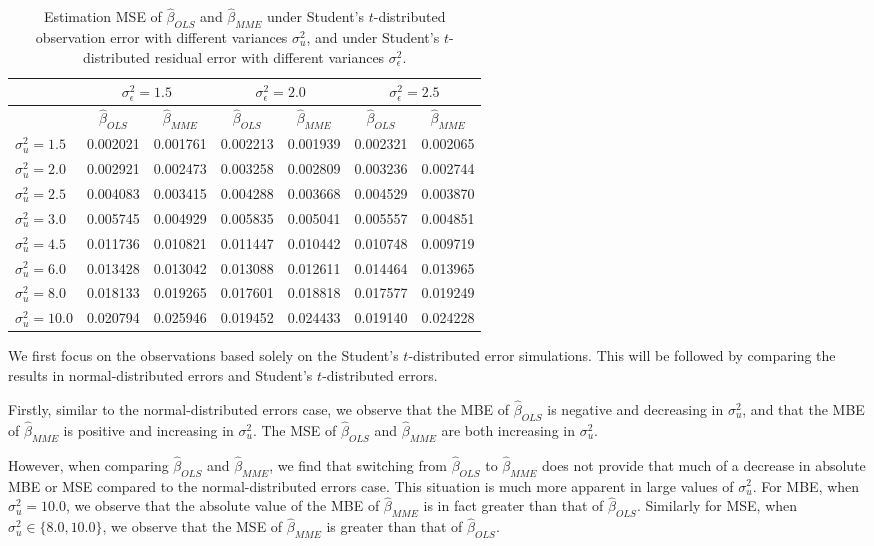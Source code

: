 \documentclass{article}
\begin{document}
\begin{table}[ht]
    \centering
    \caption{Estimation MSE of $\hat{\beta}_{OLS}$ and $\hat{\beta}_{MME}$ under Student's $t$-distributed observation error with different variances $\sigma^2_u$, and under Student's $t$-distributed residual error with different variances $\sigma^2_\epsilon$.}
    \label{Tab:MSE_t}
    \begin{tabular}[t]{lcccccc}
        \hline
        &\multicolumn{2}{c}{$\sigma^2_\epsilon=1.5$}&\multicolumn{2}{c}{$\sigma^2_\epsilon=2.0$}&\multicolumn{2}{c}{$\sigma^2_\epsilon=2.5$}\\
        \hline
        &$\hat{\beta}_{OLS}$&$\hat{\beta}_{MME}$&$\hat{\beta}_{OLS}$&$\hat{\beta}_{MME}$&$\hat{\beta}_{OLS}$&$\hat{\beta}_{MME}$\\
        \hline
        $\sigma^2_u = 1.5$&0.002021&0.001761&0.002213&0.001939&0.002321&0.002065\\
        $\sigma^2_u = 2.0$&0.002921&0.002473&0.003258&0.002809&0.003236&0.002744\\
        $\sigma^2_u = 2.5$&0.004083&0.003415&0.004288&0.003668&0.004529&0.003870\\
        $\sigma^2_u = 3.0$&0.005745&0.004929&0.005835&0.005041&0.005557&0.004851\\
        $\sigma^2_u = 4.5$&0.011736&0.010821&0.011447&0.010442&0.010748&0.009719\\
        $\sigma^2_u = 6.0$&0.013428&0.013042&0.013088&0.012611&0.014464&0.013965\\
        $\sigma^2_u = 8.0$&0.018133&0.019265&0.017601&0.018818&0.017577&0.019249\\
        $\sigma^2_u = 10.0$&0.020794&0.025946&0.019452&0.024433&0.019140&0.024228\\
    \end{tabular}
\end{table}

We first focus on the observations based solely on the Student's $t$-distributed error simulations. This will be followed by comparing the results in normal-distributed errors and Student's $t$-distributed errors. 

Firstly, similar to the normal-distributed errors case, we observe that the MBE of $\hat{\beta}_{OLS}$ is negative and decreasing in $\sigma^2_u$,
and that the MBE of $\hat{\beta}_{MME}$ is positive and increasing in $\sigma^2_u$.
The MSE of $\hat{\beta}_{OLS}$ and $\hat{\beta}_{MME}$ are both increasing in $\sigma^2_u$.

However, when comparing $\hat{\beta}_{OLS}$ and $\hat{\beta}_{MME}$,
we find that switching from $\hat{\beta}_{OLS}$ to $\hat{\beta}_{MME}$ does not provide that much of a decrease in absolute MBE or MSE
compared to the normal-distributed errors case.
This situation is much more apparent in large values of $\sigma^2_u$.
For MBE, when $\sigma^2_u = 10.0$, we observe that the absolute value of the MBE of $\hat{\beta}_{MME}$ is in fact greater than that of $\hat{\beta}_{OLS}$.
Similarly for MSE, when $\sigma^2_u \in \{8.0, 10.0\}$, we observe that the MSE of $\hat{\beta}_{MME}$ is greater than that of $\hat{\beta}_{OLS}$.
\end{document}
